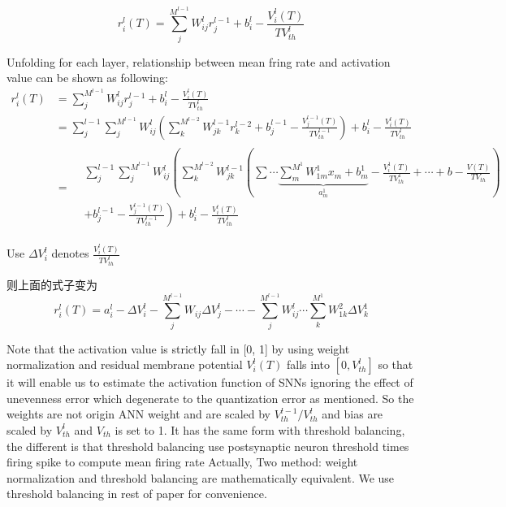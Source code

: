 \documentclass{article}
\begin{document}
\begin{equation}
  r_i^l(T) = \sum_j^{M^{l-1}}W_{ij}^lr_j^{l-1}+b_i^l - \frac{V_i^l(T)}{TV_{th}^{l}}
\end{equation}

Unfolding for each layer, relationship between mean fring rate and activation value can be shown as following:
\begin{equation}
  \begin{aligned}
    r_i^l(T) &=\sum_j^{M^{l-1}}W_{ij}^lr_j^{l-1}+b_i^l - \frac{V_i^l(T)}{TV_{th}^{l}} \\
    &=\sum_j^{l-1} \sum_j^{M^{l-1}}W_{ij}^l\left(\sum_k^{M^{l-2}}W_{jk}^{l-1}r_k^{l-2}+b_j^{l-1} - \frac{V_j^{l-1}(T)}{TV_{th}^{l-1}} \right) + b_i^l - \frac{V_i^{l}(T)}{TV_{th}^{l}}\\
    &= \begin{split}
        &\sum_j^{l-1} \sum_j^{M^{l-1}}W_{ij}^l\left(\sum_k^{M^{l-2}}W_{jk}^{l-1}\left(\sum\cdots \underbrace{\sum_m^{M^{1}}W_{1m}^1x_m+b_m^1}_{a_m^1} - \frac{V_i^1(T)}{TV_{th}^{1}} + \cdots + b - \frac{V(T)}{TV_{th}} \right) \right.\\ 
        &\left. + b_j^{l-1} - \frac{V_j^{l-1}(T)}{TV_{th}^{l-1}} \right) + b_i^l - \frac{V_i^{l}(T)}{TV_{th}^l}
    \end{split}
\end{aligned}
\end{equation}

Use $\Delta V_i^l$ denotes $\frac{V_i^{l}(T)}{TV_{th}^l}$

则上面的式子变为
\begin{equation}
    r_i^l(T) = a_i^l - \Delta V_i^l - \sum_j^{M^{l-1}}W_{ij}\Delta V_j^l - \cdots -\sum_j^{M^{l-1}}W_{ij}^l \cdots \sum_k^{M^{1}}W_{1k}^2 \Delta V_k^1
\end{equation}

Note that the activation value is strictly fall in [0, 1] by using weight normalization and residual membrane potential $V_i^l(T)$ falls into $[0, V_{th}^l]$ so that it will enable us to estimate the activation function of SNNs ignoring the effect
of unevenness error which degenerate to the quantization error as \cite{bu2021optimal} mentioned.
So the weights are not origin ANN weight and are scaled by $V_{th}^{l-1}/V_{th}^l$ and bias are scaled by $V_{th}^l$ and $V_{th}$ is set to 1.
It has the same form with threshold balancing, the different is that threshold balancing use postsynaptic neuron threshold times firing spike to compute mean firing rate
Actually, Two method: weight normalization and threshold balancing are mathematically equivalent. We use threshold balancing in rest of paper for convenience.
\end{document}
